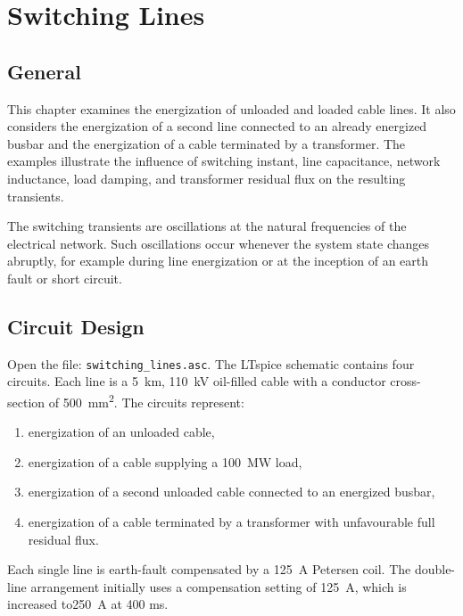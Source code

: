 \chapter{Switching Lines}
\label{chap:chapter4}

\section{General}
\label{sec:section41}

This chapter examines the energization of unloaded and loaded cable lines. It
also considers the energization of a second line connected to an already
energized busbar and the energization of a cable terminated by a transformer.
The examples illustrate the influence of switching instant, line capacitance,
network inductance, load damping, and transformer residual flux on the
resulting transients.

The switching transients are oscillations at the natural frequencies of the
electrical network. Such oscillations occur whenever the system state changes
abruptly, for example during line energization or at the inception of an earth
fault or short circuit.

\section{Circuit Design}
\label{sec:section42}

Open the file: \texttt{switching\_lines.asc}. The LTspice schematic contains four circuits. Each line is a
\SI{5}{\kilo\metre}, \SI{110}{\kilo\volt} oil-filled cable with a conductor
cross-section of \SI{500}{\milli\metre\squared}. The circuits represent:

\begin{enumerate}
\item energization of an unloaded cable,
\item energization of a cable supplying a \SI{100}{\mega\watt} load,
\item energization of a second unloaded cable connected to an energized busbar,
\item energization of a cable terminated by a transformer with unfavourable
      full residual flux.
\end{enumerate}

Each single line is earth-fault compensated by a \SI{125}{\ampere} Petersen
coil. The double-line arrangement initially uses a compensation setting of \SI{125}{\ampere}, which is increased to\SI{250}{\ampere} at 400 ms. 



